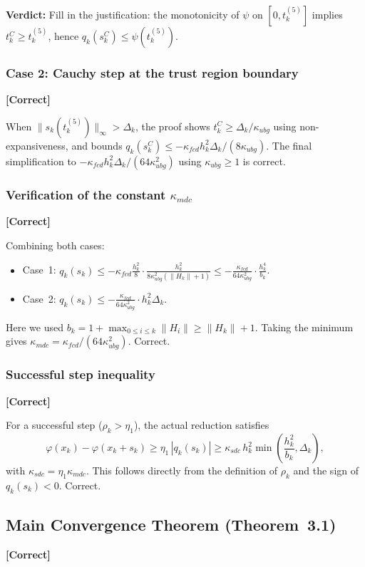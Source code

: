 \documentclass[11pt]{article}
\newcommand{\verdict}[1]{\par\medskip\noindent\textbf{Verdict:} #1\par\medskip}
\newcommand{\statusok}{\textcolor{okcolor}{\textbf{[Correct]}}}
\theoremstyle{plain}
\begin{document}
\verdict{Fill in the justification: the monotonicity of $\psi$ on $[0,t_k^{(5)}]$ implies $t_k^C \ge t_k^{(5)}$, hence $q_k(s_k^C) \le \psi(t_k^{(5)})$.}

\subsubsection{Case 2: Cauchy step at the trust region boundary}
\statusok

When $\|s_k(t_k^{(5)})\|_\infty > \Delta_k$, the proof shows $t_k^C \ge \Delta_k/\kappa_{ubg}$ using non-expansiveness, and bounds $q_k(s_k^C) \le -\kappa_{fcd}h_k^2\Delta_k/(8\kappa_{ubg})$. The final simplification to $-\kappa_{fcd}h_k^2\Delta_k/(64\kappa_{ubg}^2)$ using $\kappa_{ubg} \ge 1$ is correct.

\subsubsection{Verification of the constant $\kappa_{mdc}$}
\statusok

Combining both cases:
\begin{itemize}
  \item Case~1: $q_k(s_k) \le -\kappa_{fcd}\frac{h_k^2}{8}\cdot\frac{h_k^2}{8\kappa_{ubg}^2(\|H_k\|+1)} \le -\frac{\kappa_{fcd}}{64\kappa_{ubg}^2}\cdot\frac{h_k^4}{b_k}$.
  \item Case~2: $q_k(s_k) \le -\frac{\kappa_{fcd}}{64\kappa_{ubg}^2}\cdot h_k^2\Delta_k$.
\end{itemize}
Here we used $b_k = 1 + \max_{0\le i\le k}\|H_i\| \ge \|H_k\| + 1$. Taking the minimum gives $\kappa_{mdc} = \kappa_{fcd}/(64\kappa_{ubg}^2)$. Correct.

\subsubsection{Successful step inequality}
\statusok

For a successful step ($\rho_k > \eta_1$), the actual reduction satisfies
\[
\varphi(x_k) - \varphi(x_k + s_k) \ge \eta_1\,|q_k(s_k)| \ge \kappa_{sdc}\,h_k^2\min\!\left(\frac{h_k^2}{b_k},\Delta_k\right),
\]
with $\kappa_{sdc} = \eta_1\kappa_{mdc}$. This follows directly from the definition of $\rho_k$ and the sign of $q_k(s_k) < 0$. Correct.

\subsection{Main Convergence Theorem (Theorem~3.1)}
\statusok
\end{document}
